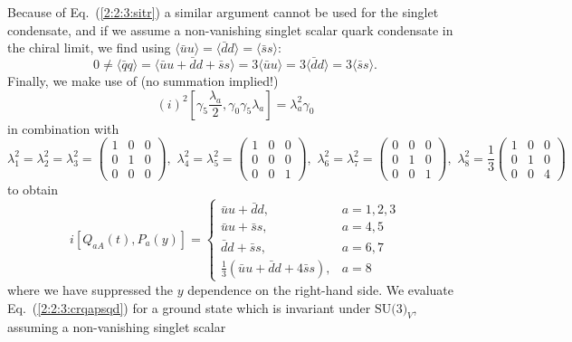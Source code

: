 \documentclass[twoside,12pt]{article}
\begin{document}
   Because of Eq.\ (\ref{2:2:3:sitr}) a similar argument cannot be used
for the singlet condensate, and if we assume a non-vanishing
singlet scalar quark condensate in the chiral limit, we find using
$\langle\bar{u}u\rangle=\langle\bar{d}d\rangle=
\langle\bar{s}s\rangle$:
\begin{equation}
\label{2:2:3:cqc}
0\neq \langle \bar{q}q\rangle
=\langle\bar{u}u+\bar{d}d+\bar{s}s\rangle
=3\langle\bar{u}u\rangle =
3\langle\bar{d}d\rangle
=3\langle \bar{s}s\rangle.
\end{equation}
   Finally, we make use of (no summation implied!)
$$ (i)^2 [\gamma_5 \frac{\lambda_a}{2},\gamma_0\gamma_5\lambda_a]
=\lambda^2_a\gamma_0$$ in combination with
\begin{displaymath}
\lambda_1^2=\lambda_2^2=\lambda_3^2=
\left(
\begin{array}{rrr}
1&0&0\\
0&1&0\\
0&0&0
\end{array}
\right),\,\,
\lambda_4^2=\lambda_5^2=
\left(
\begin{array}{rrr}
1&0&0\\
0&0&0\\
0&0&1
\end{array}
\right),\,\,
\lambda_6^2=\lambda_7^2=
\left(
\begin{array}{rrr}
0&0&0\\
0&1&0\\
0&0&1
\end{array}
\right),\,\,
\lambda_8^2=
\frac{1}{3}
\left(
\begin{array}{rrr}
1&0&0\\
0&1&0\\
0&0&4
\end{array}
\right)
\end{displaymath}
to obtain
\begin{equation}
\label{2:2:3:crqapsqd}
i[Q_{aA}(t), P_a(y)]
=
\left \{\begin{array}{cl}
\bar{u}u+\bar{d}d, & a=1,2,3\\
\bar{u}u+\bar{s}s, & a=4,5\\
\bar{d}d+\bar{s}s, & a=6,7\\
\frac{1}{3}(\bar{u}u+\bar{d}d+4\bar{s}s), & a=8
\end{array}
\right.
\end{equation}
where we have suppressed the $y$ dependence on the right-hand side.
   We evaluate Eq.\ (\ref{2:2:3:crqapsqd}) for a ground state which is
invariant under $\mbox{SU(3)}_V$, assuming a non-vanishing singlet scalar
\end{document}
